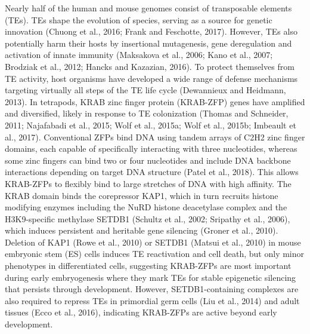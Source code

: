 \documentclass[11pt,a4paper]{article}
\begin{document}
Nearly half of the human and mouse genomes consist of transposable elements (TEs). TEs shape the evolution of species, serving as a source for genetic innovation (Chuong et al., 2016; Frank and Feschotte, 2017). However, TEs also potentially harm their hosts by insertional mutagenesis, gene deregulation and activation of innate immunity (Maksakova et al., 2006; Kano et al., 2007; Brodziak et al., 2012; Hancks and Kazazian, 2016). To protect themselves from TE activity, host organisms have developed a wide range of defense mechanisms targeting virtually all steps of the TE life cycle (Dewannieux and Heidmann, 2013). In tetrapods, KRAB zinc finger protein (KRAB-ZFP) genes have amplified and diversified, likely in response to TE colonization (Thomas and Schneider, 2011; Najafabadi et al., 2015; Wolf et al., 2015a; Wolf et al., 2015b; Imbeault et al., 2017). Conventional ZFPs bind DNA using tandem arrays of C2H2 zinc finger domains, each capable of specifically interacting with three nucleotides, whereas some zinc fingers can bind two or four nucleotides and include DNA backbone interactions depending on target DNA structure (Patel et al., 2018). This allows KRAB-ZFPs to flexibly bind to large stretches of DNA with high affinity. The KRAB domain binds the corepressor KAP1, which in turn recruits histone modifying enzymes including the NuRD histone deacetylase complex and the H3K9-specific methylase SETDB1 (Schultz et al., 2002; Sripathy et al., 2006), which induces persistent and heritable gene silencing (Groner et al., 2010). Deletion of KAP1 (Rowe et al., 2010) or SETDB1 (Matsui et al., 2010) in mouse embryonic stem (ES) cells induces TE reactivation and cell death, but only minor phenotypes in differentiated cells, suggesting KRAB-ZFPs are most important during early embryogenesis where they mark TEs for stable epigenetic silencing that persists through development. However, SETDB1-containing complexes are also required to repress TEs in primordial germ cells (Liu et al., 2014) and adult tissues (Ecco et al., 2016), indicating KRAB-ZFPs are active beyond early development.
\end{document}
